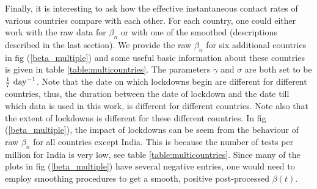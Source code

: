 \documentclass[aps,prd,10pt,twocolumn,nofootinbib]{revtex4-2}
\begin{document}
Finally, it is interesting to ask how the effective instantaneous contact rates of various countries compare with each other. 
For each country, one could either work with the raw data for $\beta_n$ or with one of the smoothed (descriptions described in the last section). We provide the raw $\beta_n$ for six additional countries in fig (\ref{beta_multiple}) and some useful basic information about these countries is given in table \ref{table:multicountries}. The parameters $\gamma$ and $\sigma$
are both set to be $\frac{1}{7}~{\rm day}^{-1}$. 
Note that the date on which lockdowns begin are different for different countries, thus, the duration between the date of lockdown and the date till which data is used in this work, is different for different countries.
Note also that the extent of lockdowns is different for these different countries.
In fig (\ref{beta_multiple}), the impact of lockdowns can be seem from the behaviour of raw $\beta_n$ for all countries except India. This is because the number of tests per million for India is very low, see table \ref{table:multicountries}. 
Since many of the plots in fig (\ref{beta_multiple}) have several negative entries, one would need to employ smoothing procedures to get a smooth, positive post-processed $\beta(t)$.
\end{document}
